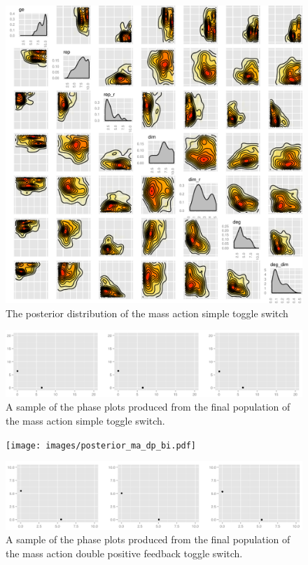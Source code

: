 \begin{figure}[p]
\centering
\includegraphics[scale=0.7]{images/posterior_ma_cl_bi.pdf}
\caption{The posterior distribution of the mass action simple toggle switch}
\label{fig:det_std}
\end{figure}

\begin{figure}[p]
\centering
\includegraphics[scale=0.4]{images/ma_cl_bi_phase_plot.png}
\caption{A sample of the phase plots produced from the final population of the mass action simple toggle switch.}
\label{fig:det_std_phase}
\end{figure}

\begin{figure}[p]
\centering
\texttt{[image: images/posterior\_ma\_dp\_bi.pdf]}
\caption{}
\label{fig:doub_pos}
\end{figure}

\begin{figure}[p]
\centering
\includegraphics[scale=0.4]{images/ma_dp_bi_phase_plot.png}
\caption{A sample of the phase plots produced from the final population of the mass action double positive feedback toggle switch.}
\label{fig:det_dp_phase}
\end{figure}

